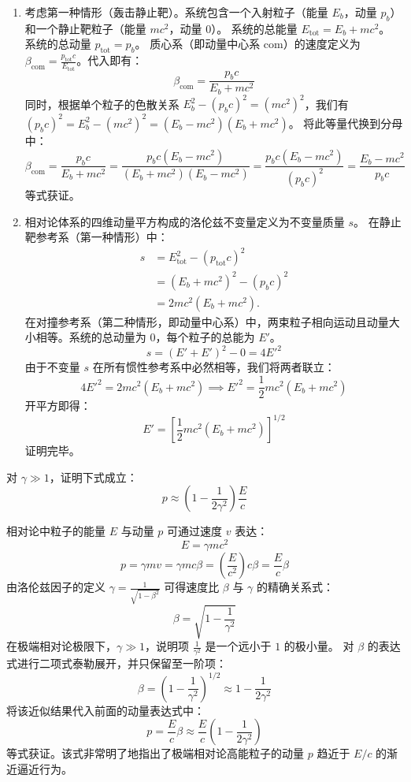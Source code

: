 \begin{solution}
\begin{enumerate}
    \item[(a)] 考虑第一种情形（轰击静止靶）。系统包含一个入射粒子（能量 $E_b$，动量 $p_b$）和一个静止靶粒子（能量 $mc^2$，动量 0）。
    系统的总能量 $E_{\mathrm{tot}} = E_b + mc^2$。
    系统的总动量 $p_{\mathrm{tot}} = p_b$。
    质心系（即动量中心系 $\mathrm{com}$）的速度定义为 $\beta_{\mathrm{com}} = \frac{p_{\mathrm{tot}} c}{E_{\mathrm{tot}}}$。代入即有：
    $$ \beta_{\mathrm{com}} = \frac{p_bc}{E_b + mc^2} $$
    同时，根据单个粒子的色散关系 $E_b^2 - (p_b c)^2 = (mc^2)^2$，我们有 $(p_b c)^2 = E_b^2 - (mc^2)^2 = (E_b - mc^2)(E_b + mc^2)$。
    将此等量代换到分母中：
    $$ \beta_{\mathrm{com}} = \frac{p_bc}{E_b + mc^2} = \frac{p_bc (E_b - mc^2)}{(E_b + mc^2)(E_b - mc^2)} = \frac{p_bc (E_b - mc^2)}{(p_bc)^2} = \frac{E_b - mc^2}{p_bc} $$
    等式获证。

    \item[(b)] 相对论体系的四维动量平方构成的洛伦兹不变量定义为不变量质量 $s$。
    在静止靶参考系（第一种情形）中：
    \[
    \begin{aligned}
    s&=E_{\mathrm{tot}}^2-(p_{\mathrm{tot}}c)^2\\
     &=(E_b+mc^2)^2-(p_bc)^2\\
     &=2mc^2(E_b+mc^2).
    \end{aligned}
    \]
    在对撞参考系（第二种情形，即动量中心系）中，两束粒子相向运动且动量大小相等。系统的总动量为 0，每个粒子的总能为 $E'$。
    $$ s = (E' + E')^2 - 0 = 4E'^2 $$
    由于不变量 $s$ 在所有惯性参考系中必然相等，我们将两者联立：
    $$ 4E'^2 = 2mc^2(E_b + mc^2) \implies E'^2 = \frac{1}{2}mc^2(E_b + mc^2) $$
    开平方即得：
    $$ E' = \left[ \frac{1}{2}mc^2(E_b + mc^2) \right]^{1/2} $$
    证明完毕。
\end{enumerate}
\end{solution}

\begin{exercise}\label{ex:9.19}
对 $\gamma \gg 1$，证明下式成立：
$$ p \approx \left(1 - \frac{1}{2\gamma^2}\right)\frac{E}{c} $$
\end{exercise}
\begin{solution}
相对论中粒子的能量 $E$ 与动量 $p$ 可通过速度 $v$ 表达：
$$ E = \gamma mc^2 $$
$$ p = \gamma m v = \gamma m c \beta = \left( \frac{E}{c^2} \right) c \beta = \frac{E}{c} \beta $$
由洛伦兹因子的定义 $\gamma = \frac{1}{\sqrt{1 - \beta^2}}$ 可得速度比 $\beta$ 与 $\gamma$ 的精确关系式：
$$ \beta = \sqrt{1 - \frac{1}{\gamma^2}} $$
在极端相对论极限下，$\gamma \gg 1$，说明项 $\frac{1}{\gamma^2}$ 是一个远小于 $1$ 的极小量。
对 $\beta$ 的表达式进行二项式泰勒展开，并只保留至一阶项：
$$ \beta = \left( 1 - \frac{1}{\gamma^2} \right)^{1/2} \approx 1 - \frac{1}{2\gamma^2} $$
将该近似结果代入前面的动量表达式中：
$$ p = \frac{E}{c} \beta \approx \frac{E}{c} \left( 1 - \frac{1}{2\gamma^2} \right) $$
等式获证。该式非常明了地指出了极端相对论高能粒子的动量 $p$ 趋近于 $E/c$ 的渐近逼近行为。
\end{solution}

